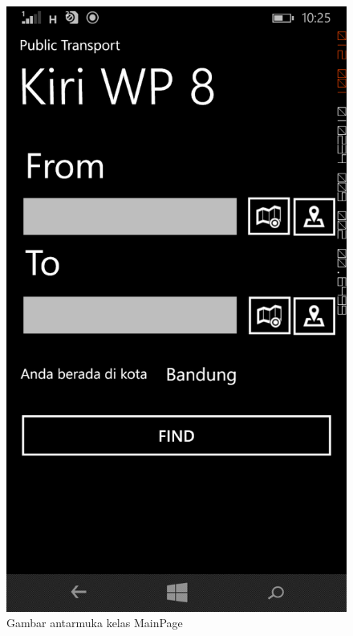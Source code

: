 	\begin{figure}[!h]
		\centering
			\includegraphics[scale=0.25]{Gambar/antarmuka/home}
		\caption{Gambar antarmuka kelas MainPage}
		\label{fig:antarmuka MainPage}
	\end{figure}
	
	\newpage
	

